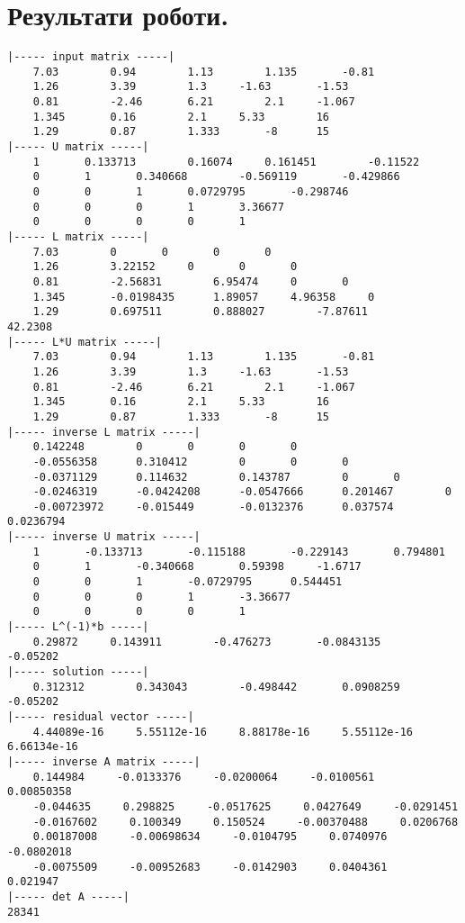 \documentclass[14pt,a4paper]{scrartcl}
\theoremstyle{definition}
\theoremstyle{remark}
\theoremstyle{definition}
\theoremstyle{definition}
\begin{document}
\section{Результати роботи.}
\begin{verbatim}
|----- input matrix -----|
	7.03        0.94        1.13        1.135       -0.81
	1.26        3.39        1.3     -1.63       -1.53
	0.81        -2.46       6.21        2.1     -1.067
	1.345       0.16        2.1     5.33        16
	1.29        0.87        1.333       -8      15
|----- U matrix -----|
	1       0.133713        0.16074     0.161451        -0.11522
	0       1       0.340668        -0.569119       -0.429866
	0       0       1       0.0729795       -0.298746
	0       0       0       1       3.36677
	0       0       0       0       1
|----- L matrix -----|
	7.03        0       0       0       0
	1.26        3.22152     0       0       0
	0.81        -2.56831        6.95474     0       0
	1.345       -0.0198435      1.89057     4.96358     0
	1.29        0.697511        0.888027        -7.87611        42.2308
|----- L*U matrix -----|
	7.03        0.94        1.13        1.135       -0.81
	1.26        3.39        1.3     -1.63       -1.53
	0.81        -2.46       6.21        2.1     -1.067
	1.345       0.16        2.1     5.33        16
	1.29        0.87        1.333       -8      15
|----- inverse L matrix -----|
	0.142248        0       0       0       0
	-0.0556358      0.310412        0       0       0
	-0.0371129      0.114632        0.143787        0       0
	-0.0246319      -0.0424208      -0.0547666      0.201467        0
	-0.00723972     -0.015449       -0.0132376      0.037574        0.0236794
|----- inverse U matrix -----|
	1       -0.133713       -0.115188       -0.229143       0.794801
	0       1       -0.340668       0.59398     -1.6717
	0       0       1       -0.0729795      0.544451
	0       0       0       1       -3.36677
	0       0       0       0       1
|----- L^(-1)*b -----|
	0.29872     0.143911        -0.476273       -0.0843135      -0.05202
|----- solution -----|
	0.312312        0.343043        -0.498442       0.0908259       -0.05202
|----- residual vector -----|
	4.44089e-16     5.55112e-16     8.88178e-16     5.55112e-16     6.66134e-16
|----- inverse A matrix -----|
	0.144984     -0.0133376     -0.0200064     -0.0100561     0.00850358
	-0.044635     0.298825     -0.0517625     0.0427649     -0.0291451
	-0.0167602     0.100349     0.150524     -0.00370488     0.0206768
	0.00187008     -0.00698634     -0.0104795     0.0740976     -0.0802018
	-0.0075509     -0.00952683     -0.0142903     0.0404361     0.021947
|----- det A -----|
28341
\end{verbatim}
\end{document}
